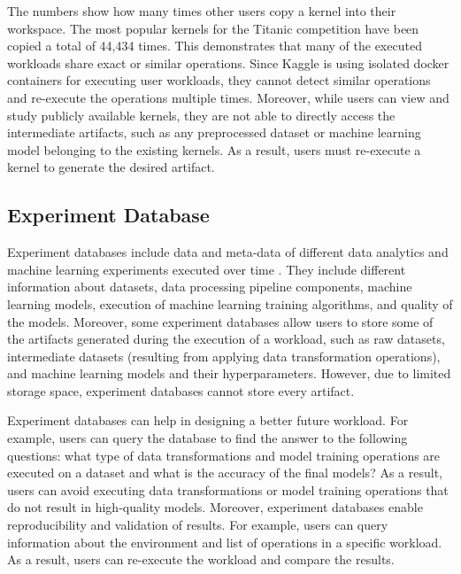 The numbers show how many times other users copy a kernel into their workspace.
The most popular kernels for the Titanic competition have been copied a total of 44,434 times.
This demonstrates that many of the executed workloads share exact or similar operations.
Since Kaggle is using isolated docker containers for executing user workloads, they cannot detect similar operations and re-execute the operations multiple times.
Moreover, while users can view and study publicly available kernels, they are not able to directly access the intermediate artifacts, such as any preprocessed dataset or machine learning model belonging to the existing kernels.
As a result, users must re-execute a kernel to generate the desired artifact.

\subsection{Experiment Database}
Experiment databases include data and meta-data of different data analytics and machine learning experiments executed over time \cite{miao2018provdb, vanschoren2014openml, schelter2017automatically, vartak2016m}.
They include different information about datasets, data processing pipeline components, machine learning models, execution of machine learning training algorithms, and quality of the models. 
Moreover, some experiment databases allow users to store some of the artifacts generated during the execution of a workload, such as raw datasets, intermediate datasets (resulting from applying data transformation operations), and machine learning models and their hyperparameters.
However, due to limited storage space, experiment databases cannot store every artifact.
 
Experiment databases can help in designing a better future workload.
For example, users can query the database to find the answer to the following questions: what type of data transformations and model training operations are executed on a dataset and what is the accuracy of the final models?
As a result, users can avoid executing data transformations or model training operations that do not result in high-quality models.
Moreover, experiment databases enable reproducibility and validation of results.
For example, users can query information about the environment and list of operations in a specific workload.
As a result, users can re-execute the workload and compare the results.